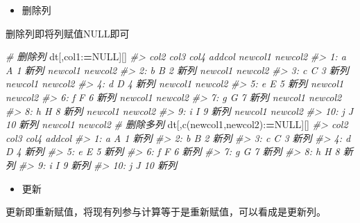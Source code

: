 \documentclass[
]{book}
\newenvironment{Shaded}{\begin{snugshade}}{\end{snugshade}}
\newcommand{\CommentTok}[1]{\textcolor[rgb]{0.56,0.35,0.01}{\textit{#1}}}
\newcommand{\ConstantTok}[1]{\textcolor[rgb]{0.00,0.00,0.00}{#1}}
\newcommand{\ErrorTok}[1]{\textcolor[rgb]{0.64,0.00,0.00}{\textbf{#1}}}
\newcommand{\FunctionTok}[1]{\textcolor[rgb]{0.00,0.00,0.00}{#1}}
\newcommand{\NormalTok}[1]{#1}
\newcommand{\SpecialCharTok}[1]{\textcolor[rgb]{0.00,0.00,0.00}{#1}}
\newcommand{\StringTok}[1]{\textcolor[rgb]{0.31,0.60,0.02}{#1}}
\providecommand{\tightlist}{%
  \setlength{\itemsep}{0pt}\setlength{\parskip}{0pt}}
\begin{document}
\begin{itemize}
\tightlist
\item
  删除列
\end{itemize}

删除列即将列赋值NULL即可

\begin{Shaded}
\begin{Highlighting}[]
\CommentTok{\# 删除列}
\NormalTok{dt[,col1}\SpecialCharTok{:}\ErrorTok{=}\ConstantTok{NULL}\NormalTok{][]}
\CommentTok{\#\textgreater{}     col2 col3 col4 addcol newcol1 newcol2}
\CommentTok{\#\textgreater{}  1:    a    A    1   新列 newcol1 newcol2}
\CommentTok{\#\textgreater{}  2:    b    B    2   新列 newcol1 newcol2}
\CommentTok{\#\textgreater{}  3:    c    C    3   新列 newcol1 newcol2}
\CommentTok{\#\textgreater{}  4:    d    D    4   新列 newcol1 newcol2}
\CommentTok{\#\textgreater{}  5:    e    E    5   新列 newcol1 newcol2}
\CommentTok{\#\textgreater{}  6:    f    F    6   新列 newcol1 newcol2}
\CommentTok{\#\textgreater{}  7:    g    G    7   新列 newcol1 newcol2}
\CommentTok{\#\textgreater{}  8:    h    H    8   新列 newcol1 newcol2}
\CommentTok{\#\textgreater{}  9:    i    I    9   新列 newcol1 newcol2}
\CommentTok{\#\textgreater{} 10:    j    J   10   新列 newcol1 newcol2}
\CommentTok{\# 删除多列}
\NormalTok{dt[,}\FunctionTok{c}\NormalTok{(}\StringTok{\textquotesingle{}newcol1\textquotesingle{}}\NormalTok{,}\StringTok{\textquotesingle{}newcol2\textquotesingle{}}\NormalTok{)}\SpecialCharTok{:}\ErrorTok{=}\ConstantTok{NULL}\NormalTok{][]}
\CommentTok{\#\textgreater{}     col2 col3 col4 addcol}
\CommentTok{\#\textgreater{}  1:    a    A    1   新列}
\CommentTok{\#\textgreater{}  2:    b    B    2   新列}
\CommentTok{\#\textgreater{}  3:    c    C    3   新列}
\CommentTok{\#\textgreater{}  4:    d    D    4   新列}
\CommentTok{\#\textgreater{}  5:    e    E    5   新列}
\CommentTok{\#\textgreater{}  6:    f    F    6   新列}
\CommentTok{\#\textgreater{}  7:    g    G    7   新列}
\CommentTok{\#\textgreater{}  8:    h    H    8   新列}
\CommentTok{\#\textgreater{}  9:    i    I    9   新列}
\CommentTok{\#\textgreater{} 10:    j    J   10   新列}
\end{Highlighting}
\end{Shaded}

\begin{itemize}
\tightlist
\item
  更新
\end{itemize}

更新即重新赋值，将现有列参与计算等于是重新赋值，可以看成是更新列。
\end{document}
